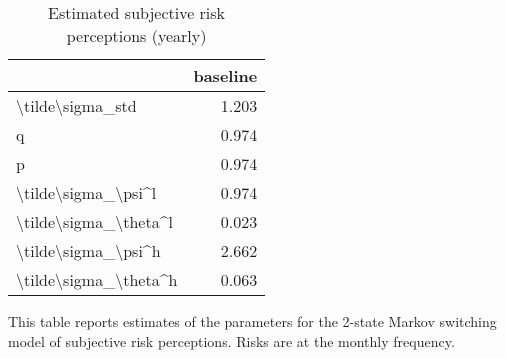 
\begin{table}[p]
\centering
\begin{adjustbox}{width=0.3\textwidth}
\begin{threeparttable}
\caption{Estimated subjective risk perceptions (yearly)}
\label{tab:PRMarkovEst}\begin{tabular}{lr}
\toprule
{} &  baseline \\
\midrule
\textbackslash tilde\textbackslash sigma\_std      &     1.203 \\
q                     &     0.974 \\
p                     &     0.974 \\
\textbackslash tilde\textbackslash sigma\_\textbackslash psi\textasciicircum l   &     0.974 \\
\textbackslash tilde\textbackslash sigma\_\textbackslash theta\textasciicircum l &     0.023 \\
\textbackslash tilde\textbackslash sigma\_\textbackslash psi\textasciicircum h   &     2.662 \\
\textbackslash tilde\textbackslash sigma\_\textbackslash theta\textasciicircum h &     0.063 \\
\bottomrule
\end{tabular}
\begin{tablenotes}\item This table reports estimates of the parameters 
for the 2-state Markov switching model of subjective risk perceptions. Risks are at the monthly frequency. 
\end{tablenotes}
\end{threeparttable}
\end{adjustbox}
\end{table}